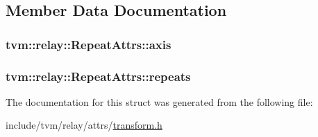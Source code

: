 \subsection{Member Data Documentation}
\subsubsection[{\texorpdfstring{axis}{axis}}]{ tvm\+::relay\+::\+Repeat\+Attrs\+::axis}\hypertarget{structtvm_1_1relay_1_1RepeatAttrs_a91f67f0c8914efd2b7359eea9074b43f}{}\label{structtvm_1_1relay_1_1RepeatAttrs_a91f67f0c8914efd2b7359eea9074b43f}
\subsubsection[{\texorpdfstring{repeats}{repeats}}]{ tvm\+::relay\+::\+Repeat\+Attrs\+::repeats}\hypertarget{structtvm_1_1relay_1_1RepeatAttrs_ade3005a90c1ff77a1f583c4a7ba898e0}{}\label{structtvm_1_1relay_1_1RepeatAttrs_ade3005a90c1ff77a1f583c4a7ba898e0}


The documentation for this struct was generated from the following file\+:\begin{DoxyCompactItemize}
\item 
include/tvm/relay/attrs/\hyperlink{include_2tvm_2relay_2attrs_2transform_8h}{transform.\+h}\end{DoxyCompactItemize}
